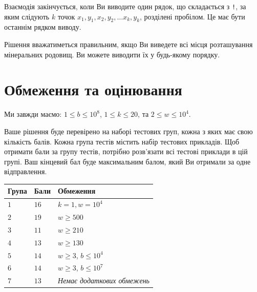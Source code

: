 Взаємодія закінчується, коли Ви виводите один рядок, що складається з \texttt{!}, за яким слідують $k$ точок $x_1, y_1, x_2, y_2, \ldots x_k, y_k$, розділені пробілом.
Це має бути останнім рядком виводу.

Рішення вважатиметься правильним, якщо Ви виведете всі місця розташування мінеральних родовищ.
Ви можете виводити їх у будь-якому порядку.

\section*{Обмеження та оцінювання}

Ми завжди маємо:
$1\leq b \leq 10^8$, %
$1 \leq k \leq 20$, %
та
$2 \le w \le 10^4$. %

Ваше рішення буде перевірено на наборі тестових груп, кожна з яких має свою кількість балів.
Кожна група тестів містить набір тестових прикладів.
Щоб отримати бали за групу тестів, потрібно розв'язати всі тестові приклади в цій групі.
Ваш кінцевий бал буде максимальним балом, який Ви отримали за одне відправлення.

\medskip
\begin{tabular}{lll}
Група & Бали & Обмеження \\\hline
  $1$ & $16$ & $k = 1, w = 10^4$\\
  $2$ & $19$ & $w \ge 500$\\
  $3$ & $11$ & $w \ge 210$\\
  $4$ & $13$ & $w \ge 130$\\
  $5$ & $14$ & $w \ge 3$, $b \le 10^4$\\
  $6$ & $14$ & $w \ge 3$, $b \le 10^7$\\
  $7$ & $13$ & \emph{Немає додаткових обмежень}
\end{tabular}

